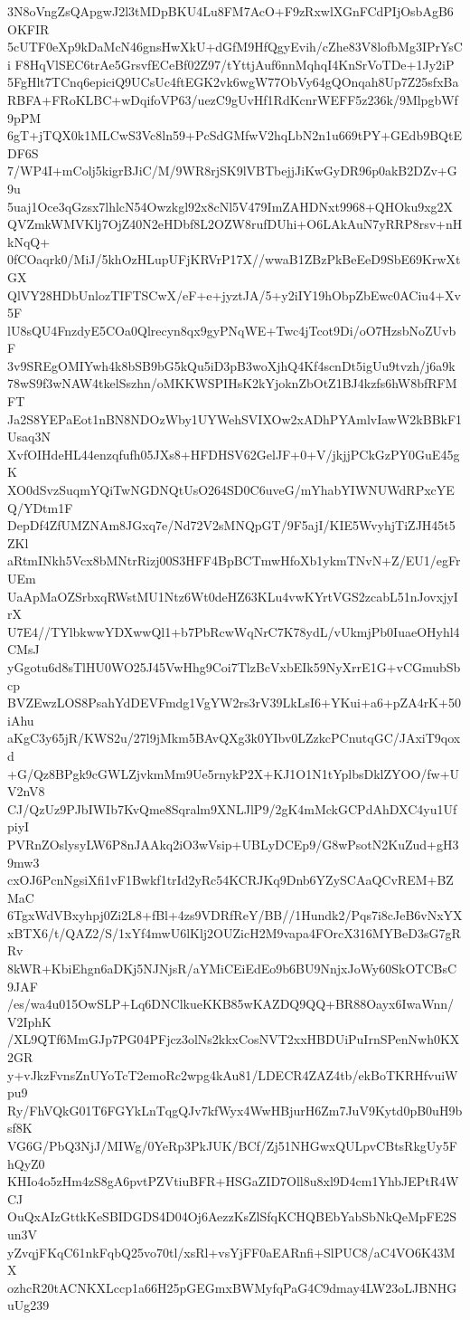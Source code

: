 3N8oVngZsQApgwJ2l3tMDpBKU4Lu8FM7AcO+F9zRxwlXGnFCdPIjOsbAgB6OKFIR
5cUTF0eXp9kDaMcN46gnsHwXkU+dGfM9HfQgyEvih/cZhe83V8lofbMg3IPrYsCi
F8HqVlSEC6trAe5GrsvfECeBf02Z97/tYttjAuf6nnMqhqI4KnSrVoTDe+1Jy2iP
5FgHlt7TCnq6epiciQ9UCsUc4ftEGK2vk6wgW77ObVy64gQOnqah8Up7Z25sfxBa
RBFA+FRoKLBC+wDqifoVP63/uezC9gUvHf1RdKcnrWEFF5z236k/9MlpgbWf9pPM
6gT+jTQX0k1MLCwS3Vc8ln59+PcSdGMfwV2hqLbN2n1u669tPY+GEdb9BQtEDF6S
7/WP4I+mColj5kigrBJiC/M/9WR8rjSK9lVBTbejjJiKwGyDR96p0akB2DZv+G9u
5uaj1Oce3qGzsx7lhlcN54Owzkgl92x8cNl5V479ImZAHDNxt9968+QHOku9xg2X
QVZmkWMVKlj7OjZ40N2eHDbf8L2OZW8rufDUhi+O6LAkAuN7yRRP8rsv+nHkNqQ+
0fCOaqrk0/MiJ/5khOzHLupUFjKRVrP17X//wwaB1ZBzPkBeEeD9SbE69KrwXtGX
QlVY28HDbUnlozTIFTSCwX/eF+e+jyztJA/5+y2iIY19hObpZbEwc0ACiu4+Xv5F
lU8sQU4FnzdyE5COa0Qlrecyn8qx9gyPNqWE+Twc4jTcot9Di/oO7HzsbNoZUvbF
3v9SREgOMIYwh4k8bSB9bG5kQu5iD3pB3woXjhQ4Kf4scnDt5igUu9tvzh/j6a9k
78wS9f3wNAW4tkelSszhn/oMKKWSPIHsK2kYjoknZbOtZ1BJ4kzfs6hW8bfRFMFT
Ja2S8YEPaEot1nBN8NDOzWby1UYWehSVIXOw2xADhPYAmlvIawW2kBBkF1Usaq3N
XvfOIHdeHL44enzqfufh05JXs8+HFDHSV62GelJF+0+V/jkjjPCkGzPY0GuE45gK
XO0dSvzSuqmYQiTwNGDNQtUsO264SD0C6uveG/mYhabYIWNUWdRPxcYEQ/YDtm1F
DepDf4ZfUMZNAm8JGxq7e/Nd72V2sMNQpGT/9F5ajI/KIE5WvyhjTiZJH45t5ZKl
aRtmINkh5Vcx8bMNtrRizj00S3HFF4BpBCTmwHfoXb1ykmTNvN+Z/EU1/egFrUEm
UaApMaOZSrbxqRWstMU1Ntz6Wt0deHZ63KLu4vwKYrtVGS2zcabL51nJovxjyIrX
U7E4//TYlbkwwYDXwwQl1+b7PbRcwWqNrC7K78ydL/vUkmjPb0IuaeOHyhl4CMsJ
yGgotu6d8sTlHU0WO25J45VwHhg9Coi7TlzBcVxbEIk59NyXrrE1G+vCGmubSbcp
BVZEwzLOS8PsahYdDEVFmdg1VgYW2rs3rV39LkLsI6+YKui+a6+pZA4rK+50iAhu
aKgC3y65jR/KWS2u/27l9jMkm5BAvQXg3k0YIbv0LZzkcPCnutqGC/JAxiT9qoxd
+G/Qz8BPgk9cGWLZjvkmMm9Ue5rnykP2X+KJ1O1N1tYplbsDklZYOO/fw+UV2nV8
CJ/QzUz9PJbIWIb7KvQme8Sqralm9XNLJlP9/2gK4mMckGCPdAhDXC4yu1UfpiyI
PVRnZOslysyLW6P8nJAAkq2iO3wVsip+UBLyDCEp9/G8wPsotN2KuZud+gH39mw3
cxOJ6PcnNgsiXfi1vF1Bwkf1trId2yRc54KCRJKq9Dnb6YZySCAaQCvREM+BZMaC
6TgxWdVBxyhpj0Zi2L8+fBl+4zs9VDRfReY/BB//1Hundk2/Pqs7i8cJeB6vNxYX
xBTX6/t/QAZ2/S/1xYf4mwU6lKlj2OUZicH2M9vapa4FOrcX316MYBeD3sG7gRRv
8kWR+KbiEhgn6aDKj5NJNjsR/aYMiCEiEdEo9b6BU9NnjxJoWy60SkOTCBsC9JAF
/es/wa4u015OwSLP+Lq6DNClkueKKB85wKAZDQ9QQ+BR88Oayx6IwaWnn/V2IphK
/XL9QTf6MmGJp7PG04PFjcz3olNs2kkxCosNVT2xxHBDUiPuIrnSPenNwh0KX2GR
y+vJkzFvnsZnUYoTcT2emoRc2wpg4kAu81/LDECR4ZAZ4tb/ekBoTKRHfvuiWpu9
Ry/FhVQkG01T6FGYkLnTqgQJv7kfWyx4WwHBjurH6Zm7JuV9Kytd0pB0uH9bsf8K
VG6G/PbQ3NjJ/MIWg/0YeRp3PkJUK/BCf/Zj51NHGwxQULpvCBtsRkgUy5FhQyZ0
KHIo4o5zHm4zS8gA6pvtPZVtiuBFR+HSGaZID7Oll8u8xl9D4cm1YhbJEPtR4WCJ
OuQxAIzGttkKeSBIDGDS4D04Oj6AezzKsZlSfqKCHQBEbYabSbNkQeMpFE2Sun3V
yZvqjFKqC61nkFqbQ25vo70tl/xsRl+vsYjFF0aEARnfi+SlPUC8/aC4VO6K43MX
ozhcR20tACNKXLccp1a66H25pGEGmxBWMyfqPaG4C9dmay4LW23oLJBNHGuUg239
